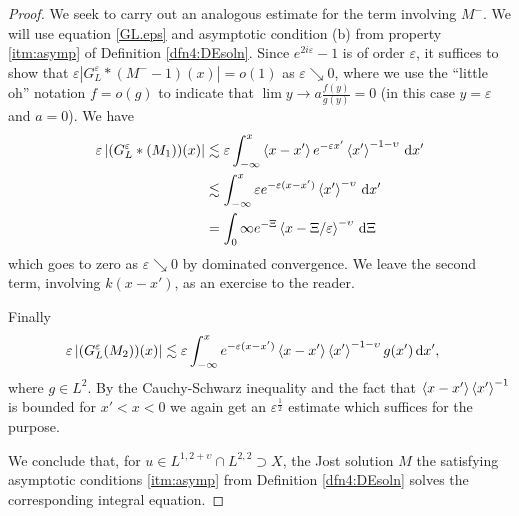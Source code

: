 \documentclass[../dissertation.tex]{subfiles}
\begin{document}
\begin{proof}
	We seek to carry out an analogous estimate for the term involving $M^-$.
	We will use equation \eqref{GL.eps} and asymptotic condition (b) from 
	property \ref{itm:asymp} of Definition \ref{dfn4:DEsoln}. Since 
	$e^{2i\varepsilon}-1$ is of order $\varepsilon$, it suffices to show that
	$\varepsilon \left| G_L^\varepsilon*(M^- -1) (x) \right| = o(1)$
	as $\varepsilon \searrow 0$, where we use the ``little oh'' notation
	$f = o(g)$ to indicate that $\lim{y\to a} \frac{f(y)}{g(y)} = 0$ (in this 
	case $y=\varepsilon$ and $a = 0$).
	We have
	\begin{align*}
		\varepsilon \left| (G_L^\varepsilon * (M_1))(x) \right|
			&\lesssim	
				\varepsilon 
				\int_{-\infty}^x 
					\left\langle x-x' \right\rangle e^{-\varepsilon x'} \left\langle x' \right\rangle^{-1-\upsilon} 
				\, \mathrm{d}x'
				\\
			&\lesssim  
				\int_{-\infty}^x 
					\varepsilon e^{-\varepsilon(x-x')} \left\langle x' \right\rangle^{-\upsilon} 
				\, \mathrm{d}x'	
				\\
			&=	
				\int_0{\infty}
					e^{-\Xi} \left\langle x-\Xi/\varepsilon \right\rangle^{-\upsilon} 
				\, \mathrm{d}\Xi
	\end{align*}
	which goes to zero as $\varepsilon \searrow 0$ by dominated convergence.
	We leave the second term, involving $k(x-x')$, as an exercise to the 
	reader.

	Finally
	\begin{align*}
		\varepsilon \left| (G_L^\varepsilon (M_2))(x) \right|
			&\lesssim 
				\varepsilon 
				\int_{-\infty}^x 
					e^{-\varepsilon (x-x')} \left\langle x-x' \right\rangle 
					\left\langle x' \right\rangle^{-1-\upsilon} g(x') 
				\, \mathrm{d}x',
		\end{align*}
	where $g \in L^2$. By the Cauchy-Schwarz inequality and the 
	fact that $\left\langle x-x' \right\rangle \left\langle x' \right\rangle^{-1}$ is bounded for $x' < x < 0$ we again 
	get an $\varepsilon^{\frac{1}{2}}$ estimate which suffices for the purpose. 

	We conclude that, for $u \in L^{1,2+\upsilon} \cap L^{2,2} \supset X$, 
	the Jost solution $M$ the satisfying asymptotic conditions \ref{itm:asymp}
	from Definition \ref{dfn4:DEsoln} solves the corresponding integral equation.
\end{proof}
\end{document}
